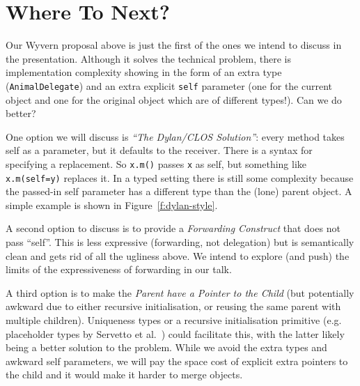 \documentclass[preprint,10pt]{sigplanconf}
\begin{document}

\section{Where To Next?}



Our Wyvern proposal above is just the first of the ones we intend to discuss in the presentation.  Although it solves the technical problem, there is implementation complexity showing in the form of an extra type (\texttt{AnimalDelegate}) and an extra explicit \texttt{self} parameter (one for the current object and one for the original object which are of different types!). Can we do better?

One option we will discuss is \textit{``The Dylan/CLOS Solution''}: every method takes self as a parameter, but it defaults to the receiver. There is a syntax for specifying a replacement. So \texttt{x.m()} passes \texttt{x} as self, but something like \texttt{x.m(self=y)} replaces it. In a typed setting there is still some complexity because the passed-in self parameter has a different type than the (lone) parent object. A simple example is shown in Figure~\ref{f:dylan-style}.

A second option to discuss is to provide a \textit{Forwarding Construct} that does not pass ``self''. This is less expressive (forwarding, not delegation) but is semantically clean and gets rid of all the ugliness above. We intend to explore (and push) the limits of the expressiveness of forwarding in our talk.


A third option is to make the \textit{Parent have a Pointer to the Child} (but potentially awkward due to either recursive initialisation, or reusing the same parent with multiple children). Uniqueness types or a recursive initialisation primitive (e.g. placeholder types by Servetto et al.~\cite{servetto:2013:billion}) could facilitate this, with the latter likely being a better solution to the problem. While we avoid the extra types and awkward self parameters, we will pay the space cost of explicit extra pointers to the child and it would make it harder to merge objects.
\end{document}
